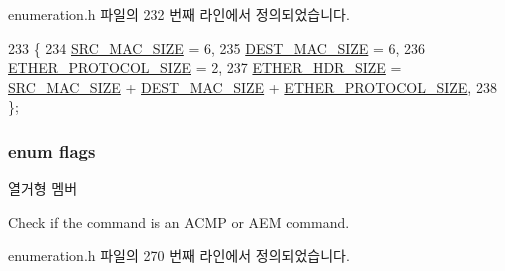 enumeration.\+h 파일의 232 번째 라인에서 정의되었습니다.


\begin{DoxyCode}
233 \{
234     \hyperlink{namespaceavdecc__lib_a6c827b1a0d973e18119c5e3da518e65ca47bc1bfd251228bd69c00a6313167289}{SRC\_MAC\_SIZE} = 6,
235     \hyperlink{namespaceavdecc__lib_a6c827b1a0d973e18119c5e3da518e65ca72afc5a69430999f92aef92a795e28cd}{DEST\_MAC\_SIZE} = 6,
236     \hyperlink{namespaceavdecc__lib_a6c827b1a0d973e18119c5e3da518e65ca98f2963240c9a606cde20e76e801b53c}{ETHER\_PROTOCOL\_SIZE} = 2,
237     \hyperlink{namespaceavdecc__lib_a6c827b1a0d973e18119c5e3da518e65ca9512ad9b34302ba7048d88197e0a2dc0}{ETHER\_HDR\_SIZE} = \hyperlink{namespaceavdecc__lib_a6c827b1a0d973e18119c5e3da518e65ca47bc1bfd251228bd69c00a6313167289}{SRC\_MAC\_SIZE} + \hyperlink{namespaceavdecc__lib_a6c827b1a0d973e18119c5e3da518e65ca72afc5a69430999f92aef92a795e28cd}{DEST\_MAC\_SIZE} + 
      \hyperlink{namespaceavdecc__lib_a6c827b1a0d973e18119c5e3da518e65ca98f2963240c9a606cde20e76e801b53c}{ETHER\_PROTOCOL\_SIZE}, 
238 \};
\end{DoxyCode}
\subsubsection[{\texorpdfstring{flags}{flags}}]{\setlength{\rightskip}{0pt plus 5cm}enum {\bf flags}}\hypertarget{namespaceavdecc__lib_ab6b306ef981f5e21bb41ea2c2dbe8cd9}{}\label{namespaceavdecc__lib_ab6b306ef981f5e21bb41ea2c2dbe8cd9}
\begin{Desc}
\item[열거형 멤버]\par
\begin{description}
\item[{\em 
C\+M\+D\+\_\+\+L\+O\+O\+K\+UP\hypertarget{namespaceavdecc__lib_ab6b306ef981f5e21bb41ea2c2dbe8cd9a3d122abbe03d5d839b4708ad02b7586d}{}\label{namespaceavdecc__lib_ab6b306ef981f5e21bb41ea2c2dbe8cd9a3d122abbe03d5d839b4708ad02b7586d}
}]Check if the command is an A\+C\+MP or A\+EM command. \end{description}
\end{Desc}


enumeration.\+h 파일의 270 번째 라인에서 정의되었습니다.


